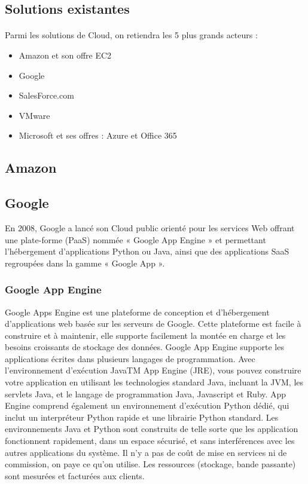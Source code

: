 \documentclass[a4paper,12pt]{report}
\begin{document}
\begin{onehalfspace}
	
	\section{Solutions existantes}
	
	\paragraph*{}
	Parmi les solutions de Cloud, on retiendra les 5 plus grands acteurs : 
	\begin{itemize}
		\item Amazon et son offre EC2
		\item Google
		\item SalesForce.com
		\item VMware
		\item Microsoft et ses offres : Azure et Office 365
	\end{itemize}
	
	
	\subsection{Amazon}

	\subsection{Google}
	En 2008, Google a lancé son Cloud public orienté pour les services Web offrant une plate-forme (PaaS) nommée « Google App Engine » et permettant l'hébergement d'applications Python ou Java, ainsi que des applications SaaS regroupées dans la gamme « Google App ».

	\subsubsection*{Google App Engine}
	Google Apps Engine est une plateforme de conception et d’hébergement d’applications web basée sur les serveurs de Google. Cette plateforme est facile à construire et à maintenir, elle supporte facilement la montée en charge et les besoins croissants de stockage des données. Google App Engine supporte les applications écrites dans plusieurs langages de programmation. Avec l'environnement d'exécution JavaTM App Engine (JRE), vous pouvez construire votre application en utilisant les technologies standard Java, incluant la JVM, les servlets Java, et le langage de programmation Java, Javascript et Ruby. App Engine comprend également un environnement d'exécution Python dédié, qui inclut un interpréteur Python rapide et une librairie Python standard. Les environnements Java et Python sont construits de telle sorte que les application fonctionnent rapidement, dans un espace sécurisé, et sans interférences avec les autres applications du système. Il n’y a pas de coût de mise en services ni de commission, on paye ce qu’on utilise. Les ressources (stockage, bande passante) sont mesurées et facturées aux clients.


\end{onehalfspace}
\end{document}
